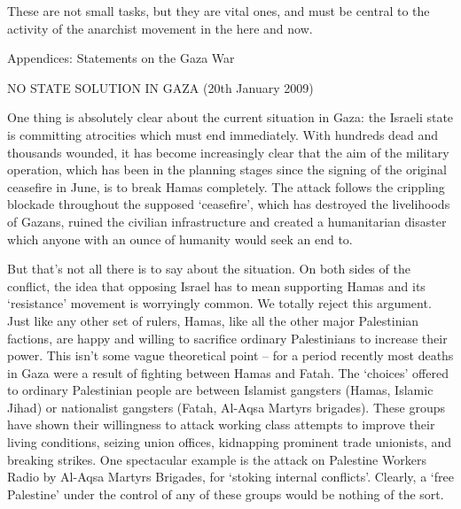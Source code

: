 These are not small tasks, but they are vital ones, and must be central to the activity of the anarchist movement in the here and now.

Appendices: Statements on the Gaza War

NO STATE SOLUTION IN GAZA (20th January 2009)

One thing is absolutely clear about the current situation in Gaza: the Israeli state is
committing atrocities which must end immediately.
With hundreds dead and thousands
wounded, it has become increasingly clear that the aim of the military operation,
which has been in the planning stages since the signing of the original ceasefire in June,
is to break Hamas completely.
The attack follows the crippling blockade throughout the
supposed ‘ceasefire’, which has destroyed the livelihoods of Gazans, ruined the civilian
infrastructure and created a humanitarian disaster which anyone with an ounce of
humanity would seek an end to.

But that’s not all there is to say about the situation.
On both sides of the conflict, the
idea that opposing Israel has to mean supporting Hamas and its ‘resistance’ movement
is worryingly common.
We totally reject this argument.
Just like any other set of rulers,
Hamas, like all the other major Palestinian factions, are happy and willing to sacrifice
ordinary Palestinians to increase their power.
This isn’t some vague theoretical point –
for a period recently most deaths in Gaza were a result of fighting between Hamas and
Fatah.
The ‘choices’ offered to ordinary Palestinian people are between Islamist gangsters
(Hamas, Islamic Jihad) or nationalist gangsters (Fatah, Al-Aqsa Martyrs brigades).
These groups have shown their willingness to attack working class attempts to improve
their living conditions, seizing union offices, kidnapping prominent trade unionists, and
breaking strikes.
One spectacular example is the attack on Palestine Workers Radio by
Al-Aqsa Martyrs Brigades, for ‘stoking internal conflicts’.
Clearly, a ‘free Palestine’
under the control of any of these groups would be nothing of the sort.

